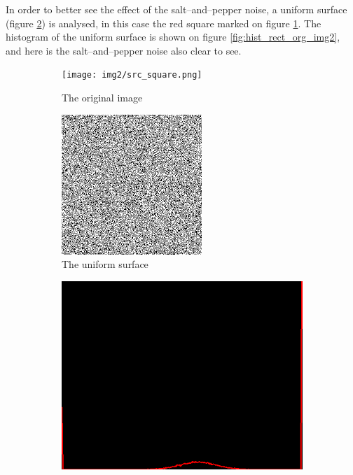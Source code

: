 In order to better see the effect of the salt--and--pepper noise, a uniform surface (figure \ref{fig:rect_org_img2}) is analysed, in this case the red square marked on figure \ref{fig:src_square}. The histogram of the uniform surface is shown on figure \ref{fig:hist_rect_org_img2}, and here is the salt--and--pepper noise also clear to see. 
\begin{figure}[H]
    \centering
    \begin{subfigure}[b]{0.22\textwidth}
        \texttt{[image: img2/src\_square.png]}
        \caption{The original image}
        \label{fig:src_square}
    \end{subfigure}
        \begin{subfigure}[b]{0.335\textwidth}
        \includegraphics[width=\textwidth]{img2/rect_org_img2.png}
        \caption{The uniform surface}
        \label{fig:rect_org_img2}
    \end{subfigure}
    \begin{subfigure}[b]{0.43\textwidth}
        \includegraphics[width=\textwidth]{img2/hist_rect_org_img2.png}

\end{subfigure}
\end{figure}
